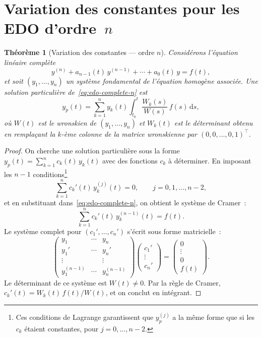 \documentclass[12pt,a4paper,openany]{book}
\theoremstyle{definition}
\theoremstyle{plain}
\newtheorem{theoreme}[definition]{Théorème}
\theoremstyle{remark}
\newcommand{\dd}{\mathrm{d}}
\begin{document}
\section{Variation des constantes pour les EDO d'ordre~$n$}\label{sec:var-cst-scalaire}

\begin{theoreme}[Variation des constantes — ordre $n$]\label{thm:var-cst-ordre-n}
  Considérons l'équation linéaire complète
  \begin{equation}\label{eq:edo-complete-n}
    y^{(n)} + a_{n-1}(t)\,y^{(n-1)} + \cdots + a_0(t)\,y = f(t),
  \end{equation}
  et soit $(y_1,\ldots,y_n)$ un système fondamental de l'équation
  homogène associée. Une solution particulière de~\eqref{eq:edo-complete-n}
  est
  \begin{equation}\label{eq:var-cst-n}
    y_p(t) = \sum_{k=1}^{n} y_k(t)\int_{t_0}^t
      \frac{W_k(s)}{W(s)}\,f(s)\,\dd s,
  \end{equation}
  où $W(t)$ est le wronskien de $(y_1,\ldots,y_n)$ et $W_k(t)$ est
  le déterminant obtenu en remplaçant la $k$-ème colonne de la matrice
  wronskienne par $(0,0,\ldots,0,1)^\top$.
\end{theoreme}

\begin{proof}
  On cherche une solution particulière sous la forme
  $y_p(t) = \sum_{k=1}^n c_k(t)\,y_k(t)$ avec des fonctions $c_k$
  à déterminer. En imposant les $n-1$ conditions\footnote{Ces conditions
  de Lagrange garantissent que
  $y_p^{(j)}$ a la même forme que si les $c_k$ étaient constantes,
  pour $j = 0,\ldots,n-2$.}
  \[
    \sum_{k=1}^n c_k'(t)\,y_k^{(j)}(t) = 0, \qquad j = 0,1,\ldots,n-2,
  \]
  et en substituant dans~\eqref{eq:edo-complete-n}, on obtient le système
  de Cramer~:
  \[
    \sum_{k=1}^n c_k'(t)\,y_k^{(n-1)}(t) = f(t).
  \]
  Le système complet pour $(c_1',\ldots,c_n')$ s'écrit sous forme
  matricielle~:
  \[
    \begin{pmatrix}
      y_1 & \cdots & y_n \\
      y_1' & \cdots & y_n' \\
      \vdots & & \vdots \\
      y_1^{(n-1)} & \cdots & y_n^{(n-1)}
    \end{pmatrix}
    \begin{pmatrix} c_1' \\ \vdots \\ c_n' \end{pmatrix}
    = \begin{pmatrix} 0 \\ \vdots \\ 0 \\ f(t) \end{pmatrix}.
  \]
  Le déterminant de ce système est $W(t) \neq 0$. Par la règle de
  Cramer, $c_k'(t) = W_k(t)\,f(t)/W(t)$, et on conclut en intégrant.
\end{proof}
\end{document}
